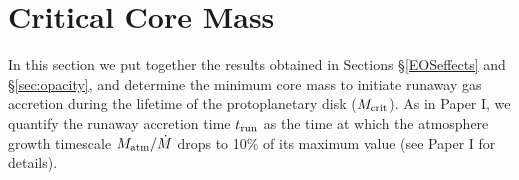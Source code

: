 \documentclass[apj]{emulateapj}
\begin{document}


\section{Critical Core Mass}
\label{critical}




In this section we put together the results obtained in Sections \S\ref{EOSeffects}  and \S\ref{sec:opacity}, and determine the minimum core mass to initiate runaway gas accretion during the lifetime of the protoplanetary disk ($M_{\rm crit}$). As in Paper I, we quantify the runaway accretion time $t_{\rm run}$ as the time at which the atmosphere growth timescale $M_{\rm atm}/\dot{M}$ drops to 10\% of its maximum value (see Paper I for details). 


\end{document}

